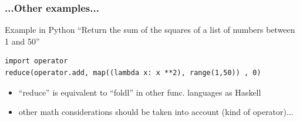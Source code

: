 \documentclass[xcolor=dvipsnames,dvip,notes=show,table]{beamer}
\begin{document}
\begin{frame}[fragile]
  \frametitle{...Other examples...}

\begin{exampleblock}{Example in Python}
``Return the sum of the squares of a list of numbers between 1 and 50''
\begin{lstlisting}
import operator
reduce(operator.add, map((lambda x: x **2), range(1,50)) , 0)
\end{lstlisting}
\end{exampleblock}

\begin{itemize}
 \item ``reduce'' is equivalent to ``foldl'' in other func. languages as Haskell
 \item other math considerations should be taken into account (kind of operator)...
\end{itemize}


\end{frame}



\end{document}
